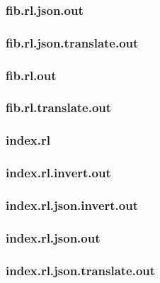 \subsubsection{fib.rl.json.out}
\label{app:fib_rl.json.out}

\subsubsection{fib.rl.json.translate.out}
\label{app:fib_rl.json.translate.out}

\subsubsection{fib.rl.out}
\label{app:fib_rl.out}

\subsubsection{fib.rl.translate.out}
\label{app:fib_rl.translate.out}

\subsubsection{index.rl}
\label{app:index_rl}

\subsubsection{index.rl.invert.out}
\label{app:index_rl.invert.out}

\subsubsection{index.rl.json.invert.out}
\label{app:index_rl.json.invert.out}

\subsubsection{index.rl.json.out}
\label{app:index_rl.json.out}

\subsubsection{index.rl.json.translate.out}
\label{app:index_rl.json.translate.out}

